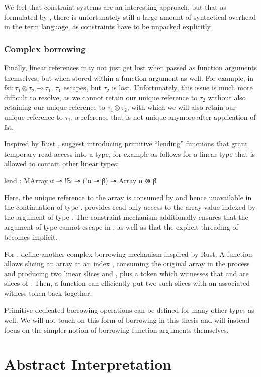 We feel that constraint systems are an interesting approach, but that as formulated by \cite{spiwack_linearly_2022}, there is unfortunately still a large amount of syntactical overhead in the term language, as constraints have to be unpacked explicitly.

\subsubsection{Complex borrowing}
Finally, linear references may not just get lost when passed as function arguments themselves, but when stored within a function argument as well. For example, in $\mathrm{fst} : \tau_1 \otimes \tau_2 \multimap \tau_1$, $\tau_1$ escapes, but $\tau_2$ is lost. Unfortunately, this issue is much more difficult to resolve, as we cannot retain our unique reference to $\tau_2$ without also retaining our unique reference to $\tau_1 \otimes \tau_2$, with which we will also retain our unique reference to $\tau_1$, a reference that is not unique anymore after application of $\mathrm{fst}$. 

Inspired by Rust \citep{weiss_oxide_2021}, \cite{spiwack_linearly_2022} suggest introducing primitive ``lending'' functions that grant temporary read access into a type, for example as follows for a linear type  that is allowed to contain other linear types:\\
\begin{code}
	lend : MArray α ⊸ !ℕ ⊸ (!α ⊸ β) ⊸ Array α ⊗ β
\end{code}

Here, the unique reference to the array is consumed by  and hence unavailable in the continuation of type .  provides read-only access to the array value indexed by the argument of type . The constraint mechanism additionally ensures that the argument of type  cannot escape in , as well as that the explicit threading of  becomes implicit.

For , \cite{spiwack_linearly_2022} define another complex borrowing mechanism inspired by Rust: A function  allows slicing an array  at an index , consuming the original array in the process and producing two linear slices \icode{x := a[0:i)} and \icode{y := a[i:len(a))}, plus a token which witnesses that  and  are slices of . Then, a function  can efficiently put two such slices with an associated witness token back together.

Primitive dedicated borrowing operations can be defined for many other types as well. We will not touch on this form of borrowing in this thesis and will instead focus on the simpler notion of borrowing function arguments themselves.

\section{Abstract Interpretation}
